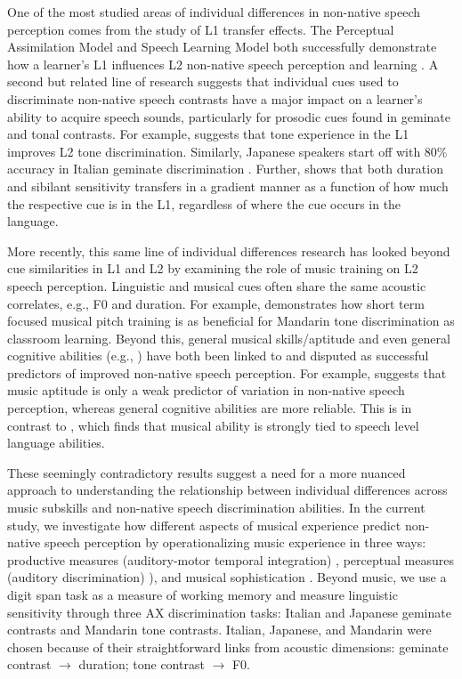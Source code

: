 \documentclass[a4paper]{article}
\begin{document}
One of the most studied areas of individual differences in non-native speech perception comes from the study of L1 transfer effects. The Perceptual Assimilation Model and Speech Learning Model both successfully demonstrate how a learner’s L1 influences L2 non-native speech perception and learning \cite{Flege_95,Best_1995}. A second but related line of research suggests that individual cues used to discriminate non-native speech contrasts have a major impact on a learner's ability to acquire speech sounds, particularly for prosodic cues found in geminate and tonal contrasts. For example, \cite{Francis_2008} suggests that tone experience in the L1 improves L2 tone discrimination.
Similarly, Japanese speakers start off with 80\% accuracy in Italian geminate discrimination \cite{Tsukada_Cox_Hajek_Hirata_2017}. Further, \cite{Pajak_2014} shows that both duration and sibilant sensitivity transfers in a gradient manner as a function of how much the respective cue is in the L1, regardless of where the cue occurs in the language. 

More recently, this same line of individual differences research has looked beyond cue similarities in L1 and L2 by examining the role of music training on L2 speech perception. Linguistic and musical cues often share the same acoustic correlates, e.g., F0 and duration. For example, \cite{Wiener_Bradley_2020} demonstrates how short term focused musical pitch training is as beneficial for Mandarin tone discrimination as classroom learning. Beyond this, general musical skills/aptitude and even general cognitive abilities (e.g., \cite{Zheng_2021}) have both been linked to and disputed as successful predictors of improved non-native speech perception. For example, \cite{Zheng_2021} suggests that music aptitude is only a weak predictor of variation in non-native speech perception, whereas general cognitive abilities are more reliable. This is in contrast to \cite{Slevc_2006}, which finds that musical ability is strongly tied to speech level language abilities. 

These seemingly contradictory results suggest a need for a more nuanced approach to understanding the relationship between individual differences across music subskills and non-native speech discrimination abilities. In the current study, we investigate how different aspects of musical experience predict non-native speech perception by operationalizing music experience in three ways: productive measures (auditory-motor temporal integration) \cite{Kachlicka_Saito_Tierney_2019}, perceptual measures (auditory discrimination) \cite[MET]{Wallentin_Nielsen_Friis-Olivarius_Vuust_Vuust_2010}), and musical sophistication \cite[Goldsmiths-MSI]{Müllensiefen_Gingras_Musil_Stewart_2014}. Beyond music, we use a digit span task as a measure of working memory and measure linguistic sensitivity through three AX discrimination tasks: Italian and Japanese geminate contrasts and Mandarin tone contrasts. Italian, Japanese, and Mandarin were chosen because of their straightforward links from acoustic dimensions: geminate contrast $\rightarrow$ duration;  tone contrast $\rightarrow$ F0.
\end{document}
